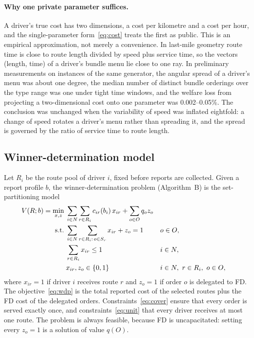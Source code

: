 \paragraph{Why one private parameter suffices.} A driver's true cost has two
dimensions, a cost per kilometre and a cost per hour, and the single-parameter
form~\eqref{eq:cost} treats the first as public. This is an empirical
approximation, not merely a convenience. In last-mile geometry route time is
close to route length divided by speed plus service time, so the vectors
(length, time) of a driver's bundle menu lie close to one ray. In
preliminary measurements on instances of the same generator, the angular
spread of a driver's menu was about one degree, the median number of distinct
bundle orderings over the type range was one under tight time windows, and
the welfare loss from projecting a two-dimensional cost onto one parameter
was 0.002--0.05\%. The conclusion was unchanged when the variability of
speed was inflated eightfold: a change of speed rotates a driver's menu
rather than spreading it, and the spread is governed by the ratio of service
time to route length.

\subsection{Winner-determination model}

Let $R_i$ be the route pool of driver $i$, fixed before reports are
collected. Given a report profile $b$, the winner-determination problem
(Algorithm~B) is the set-partitioning model
\begin{align}
V(R;b)=\min_{x,z}\;&\sum_{i\in N}\sum_{r\in R_i}c_{ir}(b_i)\,x_{ir}+\sum_{o\in O}q_o z_o
\label{eq:wdp}\\
\text{s.t.}\;&\sum_{i\in N}\sum_{r\in R_i:\,o\in S_r}x_{ir}+z_o=1 && o\in O,\label{eq:cover}\\
&\sum_{r\in R_i}x_{ir}\le 1 && i\in N,\label{eq:unit}\\
&x_{ir},z_o\in\{0,1\} && i\in N,\ r\in R_i,\ o\in O,\notag
\end{align}
where $x_{ir}=1$ if driver $i$ receives route $r$ and $z_o=1$ if order $o$
is delegated to FD. The objective~\eqref{eq:wdp} is the total reported cost
of the selected routes plus the FD cost of the delegated orders.
Constraints~\eqref{eq:cover} ensure that every order is served exactly once,
and constraints~\eqref{eq:unit} that every driver receives at most one route.
The problem is always feasible, because FD is uncapacitated: setting every
$z_o=1$ is a solution of value $q(O)$.

